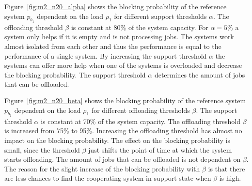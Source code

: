 
Figure~\ref{fig:m2_n20_alpha} shows the blocking probability of the reference system $p_{b_1}$ dependent on the load $\rho_1$ for different support thresholds $\alpha$. The offloading threshold $\beta$ is constant at 80\% of the system capacity. For $\alpha=5\%$ a system only helps if it is empty and is not processing jobs. The systems work almost isolated from each other and thus the performance is equal to the performance of a single system. By increasing the support threshold $\alpha$ the systems can offer more help when one of the systems is overloaded and decrease the blocking probability. The support threshold $\alpha$ determines the amount of jobs that can be offloaded.


Figure~\ref{fig:m2_n20_beta} shows the blocking probability of the reference system $p_{b_1}$ dependent on the load $\rho_1$ for different offloading thresholds $\beta$. The support threshold $\alpha$ is constant at 70\% of the system capacity. The offloading threshold $\beta$ is increased from 75\% to 95\%. Increasing the offloading threshold has almost no impact on the blocking probability. The effect on the blocking probability is small, since the threshold $\beta$ just shifts the point of time at which the system starts offloading. The amount of jobs that can be offloaded is not dependent on $\beta$. The reason for the slight increase of the blocking probability with $\beta$ is that there are less chances to find the cooperating system in support state when $\beta$ is high.


